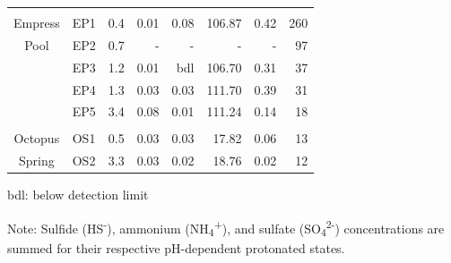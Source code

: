 \begin{table}[htbp]
\begin{adjustbox}{width=\textwidth,keepaspectratio}
\begin{threeparttable}
\begin{tabular}{clrrrrrr}
      &       &       &       &       &       &       &  \\
Empress & EP1   & 0.4   & 0.01  & 0.08  & 106.87 & 0.42  & 260 \\
Pool  & EP2   & 0.7   & -     & -     & -     & -     & 97 \\
      & EP3   & 1.2   & 0.01  & bdl   & 106.70 & 0.31  & 37 \\
      & EP4   & 1.3   & 0.03  & 0.03  & 111.70 & 0.39  & 31 \\
      & EP5   & 3.4   & 0.08  & 0.01  & 111.24 & 0.14  & 18 \\
      &       &       &       &       &       &       &  \\
Octopus & OS1   & 0.5   & 0.03  & 0.03  & 17.82 & 0.06  & 13 \\
Spring & OS2   & 3.3   & 0.03  & 0.02  & 18.76 & 0.02  & 12 \\
\bottomrule
\end{tabular}%


	\begin{tablenotes}
      \small
      \item bdl: below detection limit
      \item Note: Sulfide (HS\textsuperscript{-}), ammonium (NH\textsubscript{4}\textsuperscript{+}), and sulfate (SO\textsubscript{4}\textsuperscript{2-}) concentrations are summed for their respective pH-dependent protonated states.
      \normalsize
    \end{tablenotes}
  \label{tab:redox}%
  \end{threeparttable}
  \end{adjustbox}
\end{table}%
\doublespace




